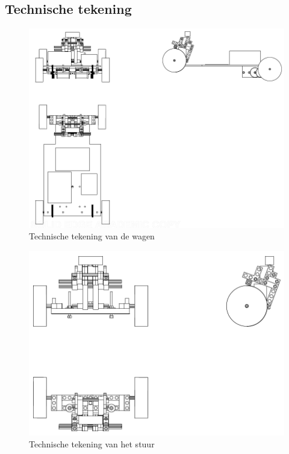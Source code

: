 \subsection{Technische tekening}
\label{bijlage:technische-tekening}
\begin{figure}[H]
\center
 \includegraphics[width=1.3\linewidth,angle=90]{bijlagen/technische-tekening/wagen.png}
 \caption{Technische tekening van de wagen}
 \label{image:technische-tekening-wagen}
\end{figure}
\begin{figure}[H]
\center
 \includegraphics[width=1.3\linewidth,angle=90]{bijlagen/technische-tekening/stuur.png}
 \caption{Technische tekening van het stuur}
 \label{image:technische-tekening-stuur}
\end{figure}
\FloatBarrier